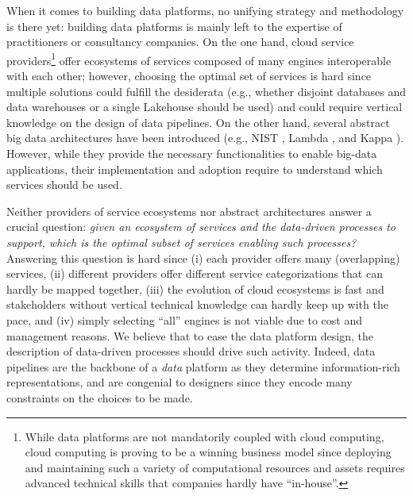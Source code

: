 When it comes to building data platforms, no unifying strategy and methodology is there yet: building data platforms is mainly left to the expertise of practitioners or consultancy companies. On the one hand, cloud service providers\footnote{While data platforms are not mandatorily coupled with cloud computing, cloud computing is proving to be a winning business model since deploying and maintaining such a variety of computational resources and assets requires advanced technical skills that companies hardly have ``in-house''.} offer ecosystems of services composed of many engines interoperable with each other; however, choosing the optimal set of services is hard since multiple solutions could fulfill the desiderata (e.g., whether disjoint databases and data warehouses or a single Lakehouse \cite{DBLP:conf/cidr/Zaharia0XA21} should be used) and could require vertical knowledge on the design of data pipelines. On the other hand, several abstract big data architectures have been introduced (e.g., NIST \cite{chang2019nist}, Lambda \cite{DBLP:conf/bigdataconf/KiranMMDB15}, and Kappa \cite{kreps2014questioning}). However, while they provide the necessary functionalities to enable big-data applications, their implementation and adoption require to understand which services should be used.

Neither providers of service ecosystems nor abstract architectures answer a crucial question: \textit{given an ecosystem of services and the data-driven processes to support, which is the optimal subset of services enabling such processes?} Answering this question is hard since (i) each provider offers many (overlapping) services, (ii) different providers offer different service categorizations that can hardly be mapped together, (iii) the evolution of cloud ecosystems is fast and stakeholders without vertical technical knowledge can hardly keep up with the pace, and (iv) simply selecting ``all'' engines is not viable due to cost and management reasons. We believe that to ease the data platform design, the description of data-driven processes should drive such activity. Indeed, data pipelines are the backbone of a \textit{data} platform as they determine information-rich representations, and are congenial to designers since they encode many constraints on the choices to be made.

